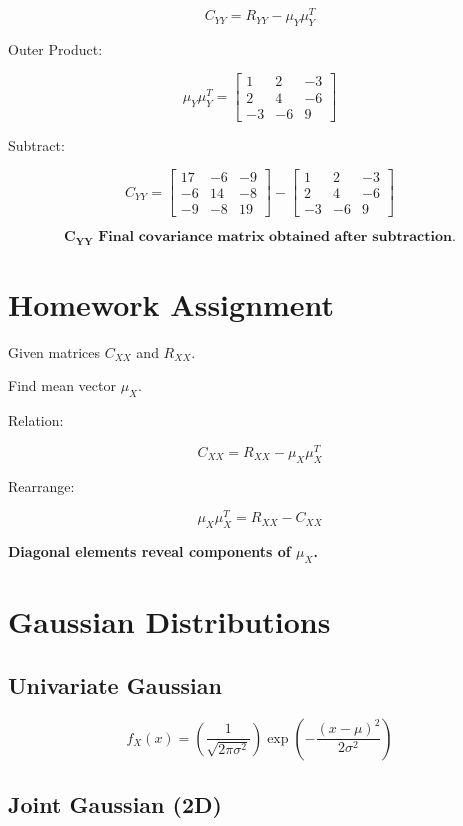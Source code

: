 \documentclass[12pt]{article}
\begin{document}
\[
C_{YY} = R_{YY} - \mu_Y \mu_Y^T
\]

Outer Product:

\[
\mu_Y \mu_Y^T =
\begin{bmatrix}
1 & 2 & -3 \\
2 & 4 & -6 \\
-3 & -6 & 9
\end{bmatrix}
\]

Subtract:

\[
C_{YY} =
\begin{bmatrix}
17 & -6 & -9 \\
-6 & 14 & -8 \\
-9 & -8 & 19
\end{bmatrix}
-
\begin{bmatrix}
1 & 2 & -3 \\
2 & 4 & -6 \\
-3 & -6 & 9
\end{bmatrix}
\]

\[
\boxed{\mathbf{C_{YY} \text{ Final covariance matrix obtained after subtraction.}}}
\]

\section{Homework Assignment}

Given matrices $C_{XX}$ and $R_{XX}$.

Find mean vector $\mu_X$.

Relation:

\[
\boxed{C_{XX} = R_{XX} - \mu_X \mu_X^T}
\]

Rearrange:

\[
\boxed{\mu_X \mu_X^T = R_{XX} - C_{XX}}
\]

\textbf{Diagonal elements reveal components of $\mu_X$.}

\section{Gaussian Distributions}

\subsection{Univariate Gaussian}

\[
\boxed{
f_X(x) =
\left(\frac{1}{\sqrt{2\pi\sigma^2}}\right)
\exp\left( -\frac{(x - \mu)^2}{2\sigma^2} \right)
}
\]

\subsection{Joint Gaussian (2D)}
\end{document}

